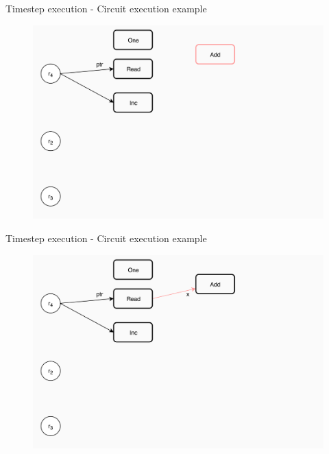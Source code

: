 \documentclass[xcolor={usenames}]{beamer}
\begin{document}
  \begin{frame}{Timestep execution - Circuit execution example}
  	\begin{figure}
  		\centering
  		\includegraphics[width=\textwidth]{../figures/example-circuit-6.png}
  	\end{figure}
  \end{frame}
  \begin{frame}{Timestep execution - Circuit execution example}
  	\begin{figure}
  		\centering
  		\includegraphics[width=\textwidth]{../figures/example-circuit-7.png}
  	\end{figure}
  \end{frame}
\end{document}
